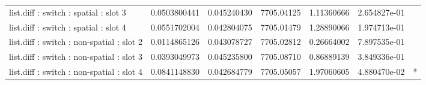 \begin{center}
\begin{longtable}{l S[table-format=>1.3] S[table-format=1.3] S[table-format=4.1,round-precision=1] S[table-format=>2.2,round-precision=2] S[table-format=>1.3] c }
list.diff : switch : spatial : slot 3      &  0.0503800441  &           0.045240430  &            7705.04125  &             1.11360666  &           2.654827e-01  &         \\
list.diff : switch : spatial : slot 4      &  0.0551702004  &           0.042804075  &            7705.01479  &             1.28890066  &           1.974713e-01  &         \\
list.diff : switch : non-spatial : slot 2  &  0.0114865126  &           0.043078727  &            7705.02812  &             0.26664002  &           7.897535e-01  &         \\
list.diff : switch : non-spatial : slot 3  &  0.0393049973  &           0.045235800  &            7705.08710  &             0.86889139  &           3.849336e-01  &         \\
list.diff : switch : non-spatial : slot 4  &  0.0841148830  &           0.042684779  &            7705.05057  &             1.97060605  &           4.880470e-02  &    *    \\ \bottomrule

\end{longtable}
\end{center}
